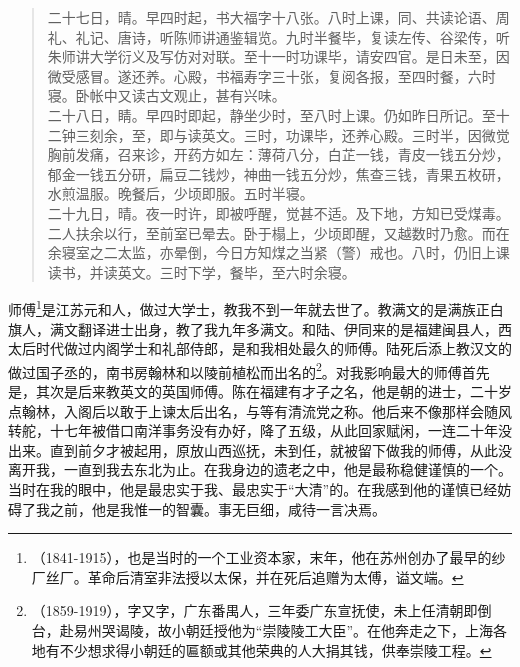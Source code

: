 \begin{quote}
	二十七日，晴。早四时起，书大福字十八张。八时上课，同、共读论语、周礼、礼记、唐诗，听陈师讲通鉴辑览。九时半餐毕，复读左传、谷梁传，听朱师讲大学衍义及写仿对对联。至十一时功课毕，请安四官。是日未至，因微受感冒。遂还养。心殿，书福寿字三十张，复阅各报，至四时餐，六时寝。卧帐中又读古文观止，甚有兴味。\\

二十八日，睛。早四时即起，静坐少时，至八时上课。仍如昨日所记。至十二钟三刻余，至，即与读英文。三时，功课毕，还养心殿。三时半，因微觉胸前发痛，召来诊，开药方如左：薄荷八分，白芷一钱，青皮一钱五分炒，郁金一钱五分研，扁豆二钱炒，神曲一钱五分炒，焦查三钱，青果五枚研，水煎温服。晚餐后，少顷即服。五时半寝。\\

二十九日，晴。夜一时许，即被呼醒，觉甚不适。及下地，方知已受煤毒。二人扶余以行，至前室已晕去。卧于榻上，少顷即醒，又越数时乃愈。而在余寝室之二太监，亦晕倒，今日方知煤之当紧（警）戒也。八时，仍旧上课读书，并读英文。三时下学，餐毕，至六时余寝。\\
\end{quote}

师傅\footnote{（1841-1915），也是当时的一个工业资本家，末年，他在苏州创办了最早的纱厂丝厂。革命后清室非法授以太保，并在死后追赠为太傅，谥文端。}是江苏元和人，做过大学士，教我不到一年就去世了。教满文的是满族正白旗人，满文翻译进士出身，教了我九年多满文。和陆、伊同来的是福建闽县人，西太后时代做过内阁学士和礼部侍郎，是和我相处最久的师傅。陆死后添上教汉文的做过国子丞的，南书房翰林和以陵前植松而出名的\footnote{（1859-1919），字又字，广东番禺人，三年委广东宣抚使，未上任清朝即倒台，赴易州哭谒陵，故小朝廷授他为“崇陵陵工大臣”。在他奔走之下，上海各地有不少想求得小朝廷的匾额或其他荣典的人大捐其钱，供奉崇陵工程。}。对我影响最大的师傅首先是，其次是后来教英文的英国师傅。陈在福建有才子之名，他是朝的进士，二十岁点翰林，入阁后以敢于上谏太后出名，与等有清流党之称。他后来不像那样会随风转舵，十七年被借口南洋事务没有办好，降了五级，从此回家赋闲，一连二十年没出来。直到前夕才被起用，原放山西巡抚，未到任，就被留下做我的师傅，从此没离开我，一直到我去东北为止。在我身边的遗老之中，他是最称稳健谨慎的一个。当时在我的眼中，他是最忠实于我、最忠实于“大清”的。在我感到他的谨慎已经妨碍了我之前，他是我惟一的智囊。事无巨细，咸待一言决焉。\\

